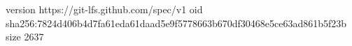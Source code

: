 version https://git-lfs.github.com/spec/v1
oid sha256:7824d406b4d7fa61eda61daad5e9f5778663b670df30468e5ce63ad861b5f23b
size 2637

